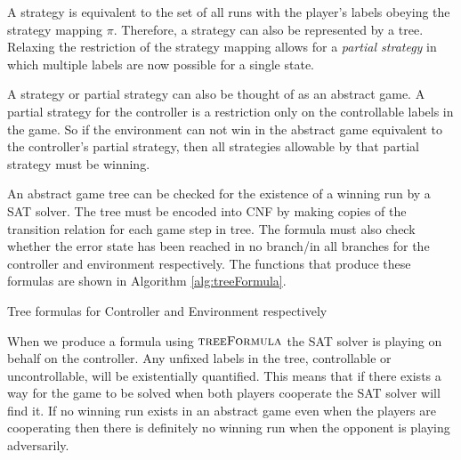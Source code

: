 \documentclass{llncs}
\begin{document}
A strategy is equivalent to the set of all runs with the player's labels
obeying the strategy mapping $\pi$. Therefore, a strategy can also be
represented by a tree. Relaxing the restriction of the strategy mapping allows
for a \emph{partial strategy} in which multiple labels are now possible for a
single state.

A strategy or partial strategy can also be thought of as an abstract game. A
partial strategy for the controller is a restriction only on the controllable
labels in the game. So if the environment can not win in the abstract game
equivalent to the controller's partial strategy, then all strategies allowable
by that partial strategy must be winning.

An abstract game tree can be checked for the existence of a winning run by a
SAT solver.  The tree must be encoded into CNF by making copies of the
transition relation for each game step in tree. The formula must also check
whether the error state has been reached in no branch/in all branches for the
controller and environment respectively. The functions that produce these
formulas are shown in Algorithm \ref{alg:treeFormula}.

\begin{algorithm}
    \caption{Tree formulas for Controller and Environment respectively}
    \label{alg:treeFormula}
    \begin{algorithmic}
        \State {}
        \Else
        \State {}
        \EndIf
        \EndFunction
    \end{algorithmic}

    \begin{algorithmic}
        \State {}
        \Else
        \State {}
        \EndIf
        \EndFunction
    \end{algorithmic}
\end{algorithm}

When we produce a formula using $\textsc{treeFormula}$ the SAT solver is
playing on behalf on the controller. Any unfixed labels in the tree,
controllable or uncontrollable, will be existentially quantified.  This means
that if there exists a way for the game to be solved when both players
cooperate the SAT solver will find it. If no winning run exists in an abstract
game even when the players are cooperating then there is definitely no winning
run when the opponent is playing adversarily.
\end{document}
